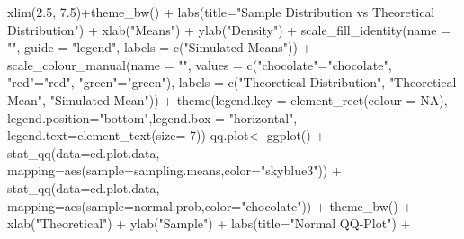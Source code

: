 \documentclass[]{article}
\newenvironment{Shaded}{}{}
\newcommand{\KeywordTok}[1]{\textcolor[rgb]{0.00,0.00,1.00}{{#1}}}
\newcommand{\DataTypeTok}[1]{{#1}}
\newcommand{\DecValTok}[1]{{#1}}
\newcommand{\FloatTok}[1]{{#1}}
\newcommand{\StringTok}[1]{\textcolor[rgb]{0.00,0.50,0.50}{{#1}}}
\newcommand{\OtherTok}[1]{\textcolor[rgb]{1.00,0.25,0.00}{{#1}}}
\newcommand{\NormalTok}[1]{{#1}}
\begin{document}
\begin{Shaded}
\begin{Highlighting}[]
\StringTok{        }\KeywordTok{xlim}\NormalTok{(}\FloatTok{2.5}\NormalTok{, }\FloatTok{7.5}\NormalTok{)+}\KeywordTok{theme_bw}\NormalTok{() +}\StringTok{ }
\StringTok{        }\KeywordTok{labs}\NormalTok{(}\DataTypeTok{title=}\StringTok{"Sample Distribution vs Theoretical Distribution"}\NormalTok{) +}\StringTok{ }
\StringTok{        }\KeywordTok{xlab}\NormalTok{(}\StringTok{"Means"}\NormalTok{) +}\StringTok{ }\KeywordTok{ylab}\NormalTok{(}\StringTok{"Density"}\NormalTok{) +}
\StringTok{        }\KeywordTok{scale_fill_identity}\NormalTok{(}\DataTypeTok{name =} \StringTok{""}\NormalTok{, }\DataTypeTok{guide =} \StringTok{"legend"}\NormalTok{,}
                            \DataTypeTok{labels =} \KeywordTok{c}\NormalTok{(}\StringTok{"Simulated Means"}\NormalTok{)) +}
\StringTok{        }\KeywordTok{scale_colour_manual}\NormalTok{(}\DataTypeTok{name =} \StringTok{""}\NormalTok{, }
                            \DataTypeTok{values =} \KeywordTok{c}\NormalTok{(}\StringTok{"chocolate"}\NormalTok{=}\StringTok{"chocolate"}\NormalTok{,}
                                       \StringTok{"red"}\NormalTok{=}\StringTok{"red"}\NormalTok{, }\StringTok{"green"}\NormalTok{=}\StringTok{"green"}\NormalTok{), }
                            \DataTypeTok{labels =} \KeywordTok{c}\NormalTok{(}\StringTok{"Theoretical Distribution"}\NormalTok{,}
                                       \StringTok{"Theoretical Mean"}\NormalTok{, }\StringTok{"Simulated Mean"}\NormalTok{)) +}
\StringTok{        }\KeywordTok{theme}\NormalTok{(}\DataTypeTok{legend.key =} \KeywordTok{element_rect}\NormalTok{(}\DataTypeTok{colour =} \OtherTok{NA}\NormalTok{), }\DataTypeTok{legend.position=}\StringTok{"bottom"}\NormalTok{,}\DataTypeTok{legend.box =} \StringTok{"horizontal"}\NormalTok{, }
              \DataTypeTok{legend.text=}\KeywordTok{element_text}\NormalTok{(}\DataTypeTok{size=} \DecValTok{7}\NormalTok{))}
\NormalTok{qq.plot<-}\StringTok{ }\KeywordTok{ggplot}\NormalTok{() +}\StringTok{ }\KeywordTok{stat_qq}\NormalTok{(}\DataTypeTok{data=}\NormalTok{ed.plot.data, }
                             \DataTypeTok{mapping=}\KeywordTok{aes}\NormalTok{(}\DataTypeTok{sample=}\NormalTok{sampling.means,}\DataTypeTok{color=}\StringTok{"skyblue3"}\NormalTok{)) +}
\StringTok{        }\KeywordTok{stat_qq}\NormalTok{(}\DataTypeTok{data=}\NormalTok{ed.plot.data, }
                \DataTypeTok{mapping=}\KeywordTok{aes}\NormalTok{(}\DataTypeTok{sample=}\NormalTok{normal.prob,}\DataTypeTok{color=}\StringTok{"chocolate"}\NormalTok{)) +}\StringTok{ }
\StringTok{        }\KeywordTok{theme_bw}\NormalTok{() +}
\StringTok{        }\KeywordTok{xlab}\NormalTok{(}\StringTok{"Theoretical"}\NormalTok{) +}\StringTok{ }\KeywordTok{ylab}\NormalTok{(}\StringTok{"Sample"}\NormalTok{) +}\StringTok{ }\KeywordTok{labs}\NormalTok{(}\DataTypeTok{title=}\StringTok{"Normal QQ-Plot"}\NormalTok{) +}\StringTok{ }

\end{Highlighting}
\end{Shaded}
\end{document}
